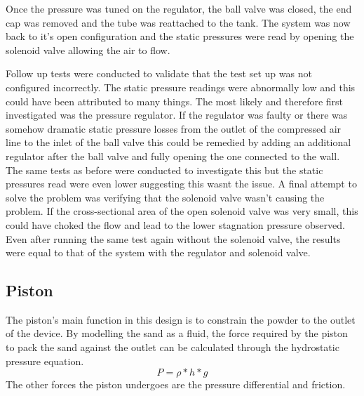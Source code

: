 Once the pressure was tuned on the regulator, the ball valve was closed, the end cap was removed and the tube was reattached to the tank. The system was now back to it's open configuration and the static pressures were read by opening the solenoid valve allowing the air to flow.

Follow up tests were conducted to validate that the test set up was not configured incorrectly. The static pressure readings were abnormally low and this could have been attributed to many things. The most likely and therefore first investigated was the pressure regulator. If the regulator was faulty or there was somehow dramatic static pressure losses from the outlet of the compressed air line to the inlet of the ball valve this could be remedied by adding an additional regulator after the ball valve and fully opening the one connected to the wall.
The same tests as before were conducted to investigate this but the static pressures read were even lower suggesting this wasnt the issue.
A final attempt to solve the problem was verifying that the solenoid valve wasn't causing the problem. If the cross-sectional area of the open solenoid valve was very small, this could have choked the flow and lead to the lower stagnation pressure observed. Even after running the same test again without the solenoid valve, the results were equal to that of the system with the regulator and solenoid valve.

\subsection{Piston}
The piston's main function in this design is to constrain the powder to the outlet of the device. By modelling the sand as a fluid, the force required by the piston to pack the sand against the outlet can be calculated through the hydrostatic pressure equation. 
\begin{equation}\label{equ:hydrostatic}
P = \rho * h * g
\end{equation}
The other forces the piston undergoes are the pressure differential and friction.

